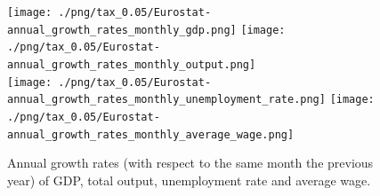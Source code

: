 \begin{figure}[H!]
\centering\leavevmode
\begin{minipage}{17cm}
\centering\leavevmode
\texttt{[image: ./png/tax\_0.05/Eurostat-annual\_growth\_rates\_monthly\_gdp.png]}
\texttt{[image: ./png/tax\_0.05/Eurostat-annual\_growth\_rates\_monthly\_output.png]}\\
\texttt{[image: ./png/tax\_0.05/Eurostat-annual\_growth\_rates\_monthly\_unemployment\_rate.png]}
\texttt{[image: ./png/tax\_0.05/Eurostat-annual\_growth\_rates\_monthly\_average\_wage.png]}
\end{minipage}
\caption{Annual growth rates (with respect to the same month the previous year) of GDP, total output, unemployment rate and average wage.}
\label{Figure: Eurostat macrodata growth rates}
\end{figure}
\clearpage

